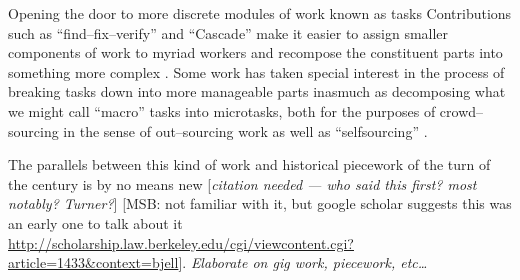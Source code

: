 \documentclass{sigchi}
\newcommand{\msb}[1]{{\color{PineGreen}[MSB: #1]}}
\begin{document}









Opening the door to more discrete modules of work known as tasks 
Contributions such as
``find--fix--verify'' %
and
``Cascade'' %
make it easier to assign smaller components of work to myriad workers and
recompose the constituent parts into something more complex
\cite{bernstein2015soylent,chilton2013cascade}.
Some work has taken special interest in the process of breaking tasks down into more manageable parts
inasmuch as decomposing what we might call ``macro'' tasks into microtasks,
both for the purposes of crowd--sourcing in the sense of out--sourcing work
as well as ``selfsourcing''
\cite{cheng2015break,teevan2014selfsourcing}.

The parallels between this kind of work and
historical piecework of the turn of the  century
is by no means new
[\textit{citation needed --- who said this first? most notably? Turner?}] \msb{not familiar with it, but google scholar suggests this was an early one to talk about it \url{http://scholarship.law.berkeley.edu/cgi/viewcontent.cgi?article=1433&context=bjell}}.
\textit{Elaborate on gig work, piecework, etc\dots}
\end{document}

